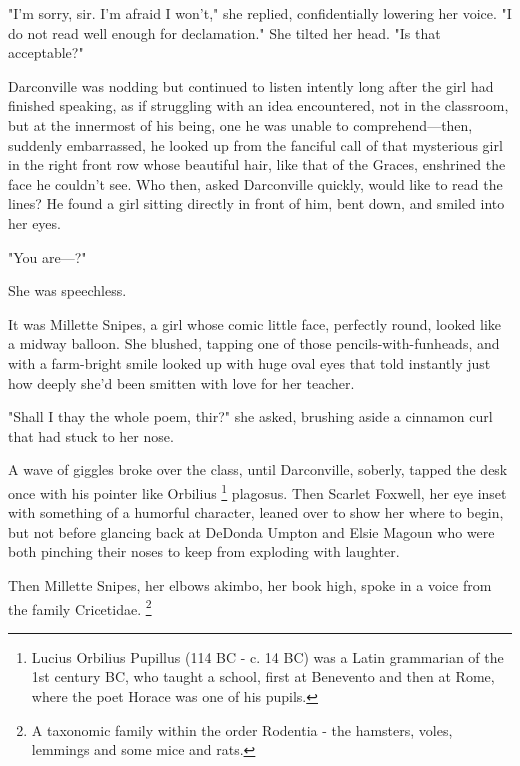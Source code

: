   "I'm sorry, sir. I'm afraid I won't," she replied, confidentially lowering her
voice. "I do not read well enough for declamation." She tilted her head. "Is
that acceptable?"

  Darconville was nodding but continued to listen intently 
long after the girl
had finished speaking, as if struggling with an idea encountered, not in the
classroom, but at the innermost of his being, one he was unable to
comprehend---then, suddenly embarrassed, he looked up from the fanciful call of
that mysterious girl in the right front row whose beautiful hair, like that of
the Graces, enshrined the face he couldn't see. Who then, asked Darconville
quickly, would like to read the lines? He found a girl sitting directly in front
of him, bent down, and smiled into her eyes.

  "You are---?"

  She was speechless.

  It was Millette Snipes, a girl whose comic little face, perfectly round,
looked like a midway balloon. She blushed, tapping one of those
pencils-with-funheads, and with a farm-bright smile looked up with huge oval
eyes that told instantly just how deeply she'd been smitten 
with love for her teacher.

  "Shall I thay the whole poem, thir?" she asked, brushing aside a cinnamon 
curl that had stuck to her nose.

  A wave of giggles broke over the class, until Darconville, soberly, tapped the
desk once with his pointer like Orbilius 
\footnote{Lucius Orbilius Pupillus (114 BC - c. 14 BC) was a Latin grammarian of
the 1st century BC, who taught a school, first at Benevento and then at Rome,
where the poet Horace was one of his pupils. 
}
plagosus. 
Then Scarlet Foxwell, her eye
inset with something of a humorful character, leaned over to show her where to
begin, but not before glancing back at DeDonda Umpton and Elsie Magoun who were
both pinching their noses to keep from exploding with laughter.

  Then Millette Snipes, her elbows akimbo, 
her book high, spoke in a voice from the family Cricetidae.
\footnote{ A taxonomic family within the order Rodentia - the hamsters, voles,
  lemmings and some mice and rats. }
 
